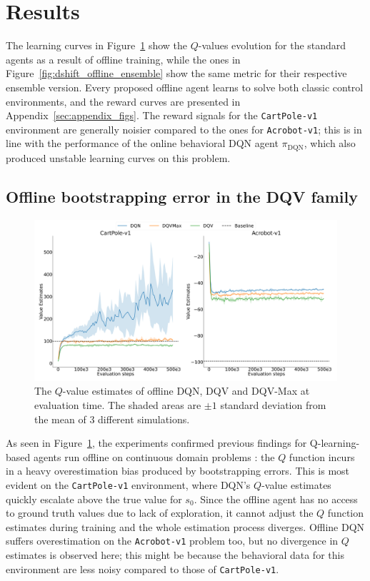 \section{Results}\label{sec:results}
The learning curves in Figure~\ref{fig:dshift_offline_normal} show the
$Q$-values evolution for the standard agents as a result of offline
training, while the ones in Figure~\ref{fig:dshift_offline_ensemble}
show the same metric for their respective ensemble version. Every
proposed offline agent learns to solve both classic control
environments, and the reward curves are presented in
Appendix~\ref{sec:appendix_figs}.
The reward signals for the \texttt{CartPole-v1} environment are
generally noisier compared to the ones for \texttt{Acrobot-v1}; this
is in line
with the performance of the online behavioral DQN agent
$\pi_{\textrm{DQN}}$, which also produced unstable learning curves on
this problem.

\subsection{Offline bootstrapping error in the DQV family}
\begin{figure}[h]
  \centering
  \includegraphics[width=.9\textwidth]{img/dshift_plots_qv.png}
  \caption{The $Q$-value estimates of offline DQN, DQV and DQV-Max at
    evaluation time. The shaded areas are $\pm 1$ standard deviation
    from the mean of 3 different
    simulations.}\label{fig:dshift_offline_normal}
\end{figure}
As seen in Figure~\ref{fig:dshift_offline_normal}, the experiments
confirmed
previous findings for Q-learning-based agents run offline on continuous
domain problems \citep{pmlr-v97-fujimoto19a,kumar2019stabilizing}: the
$Q$ function incurs in a heavy overestimation bias produced by
bootstrapping errors. This is most evident on the \texttt{CartPole-v1}
environment, where DQN's $Q$-value estimates quickly escalate above
the true value for $s_0$. Since the offline agent has no access to
ground truth
values due to lack of exploration, it cannot adjust the $Q$ function
estimates during training and the whole estimation process
diverges. Offline DQN suffers overestimation on the
\texttt{Acrobot-v1} problem too, but no divergence in $Q$ estimates is
observed here; this might be because the behavioral data for this
environment are less noisy compared to those of \texttt{CartPole-v1}.

